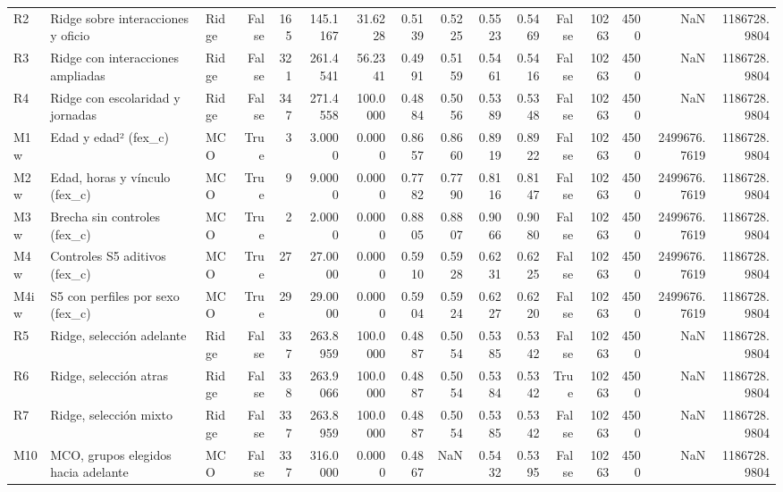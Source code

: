 \begin{tabular}{lllrrrrrrrrrrrrr}
R2 & Ridge sobre interacciones y oficio & Ridge & False & 165 & 145.1167 & 31.6228 & 0.5139 & 0.5225 & 0.5523 & 0.5469 & False & 10263 & 4500 & NaN & 1186728.9804 \\
R3 & Ridge con interacciones ampliadas & Ridge & False & 321 & 261.4541 & 56.2341 & 0.4991 & 0.5159 & 0.5461 & 0.5416 & False & 10263 & 4500 & NaN & 1186728.9804 \\
R4 & Ridge con escolaridad y jornadas & Ridge & False & 347 & 271.4558 & 100.0000 & 0.4884 & 0.5056 & 0.5389 & 0.5348 & False & 10263 & 4500 & NaN & 1186728.9804 \\
M1w & Edad y edad² (fex\_c) & MCO & True & 3 & 3.0000 & 0.0000 & 0.8657 & 0.8660 & 0.8919 & 0.8922 & False & 10263 & 4500 & 2499676.7619 & 1186728.9804 \\
M2w & Edad, horas y vínculo (fex\_c) & MCO & True & 9 & 9.0000 & 0.0000 & 0.7782 & 0.7790 & 0.8116 & 0.8147 & False & 10263 & 4500 & 2499676.7619 & 1186728.9804 \\
M3w & Brecha sin controles (fex\_c) & MCO & True & 2 & 2.0000 & 0.0000 & 0.8805 & 0.8807 & 0.9066 & 0.9080 & False & 10263 & 4500 & 2499676.7619 & 1186728.9804 \\
M4w & Controles S5 aditivos (fex\_c) & MCO & True & 27 & 27.0000 & 0.0000 & 0.5910 & 0.5928 & 0.6231 & 0.6225 & False & 10263 & 4500 & 2499676.7619 & 1186728.9804 \\
M4iw & S5 con perfiles por sexo (fex\_c) & MCO & True & 29 & 29.0000 & 0.0000 & 0.5904 & 0.5924 & 0.6227 & 0.6220 & False & 10263 & 4500 & 2499676.7619 & 1186728.9804 \\
R5 & Ridge, selección adelante & Ridge & False & 337 & 263.8959 & 100.0000 & 0.4887 & 0.5054 & 0.5385 & 0.5342 & False & 10263 & 4500 & NaN & 1186728.9804 \\
R6 & Ridge, selección atras & Ridge & False & 338 & 263.9066 & 100.0000 & 0.4887 & 0.5054 & 0.5384 & 0.5342 & True & 10263 & 4500 & NaN & 1186728.9804 \\
R7 & Ridge, selección mixto & Ridge & False & 337 & 263.8959 & 100.0000 & 0.4887 & 0.5054 & 0.5385 & 0.5342 & False & 10263 & 4500 & NaN & 1186728.9804 \\
M10 & MCO, grupos elegidos hacia adelante & MCO & False & 337 & 316.0000 & 0.0000 & 0.4867 & NaN & 0.5432 & 0.5395 & False & 10263 & 4500 & NaN & 1186728.9804 \\
\bottomrule
\end{tabular}
